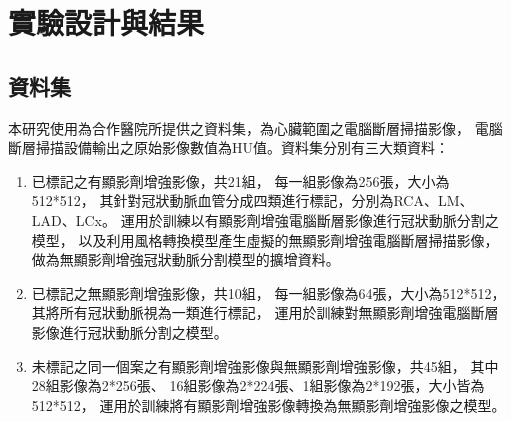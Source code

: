 \documentclass[class=NCU_thesis, crop=false]{standalone}
\begin{document}
\chapter{實驗設計與結果}

\section{資料集}
本研究使用為合作醫院所提供之資料集，為心臟範圍之電腦斷層掃描影像，
電腦斷層掃描設備輸出之原始影像數值為HU值。資料集分別有三大類資料：
\begin{enumerate}
\item 已標記之有顯影劑增強影像，共21組，
每一組影像為256張，大小為512*512，
其針對冠狀動脈血管分成四類進行標記，分別為RCA、LM、LAD、LCx。
運用於訓練以有顯影劑增強電腦斷層影像進行冠狀動脈分割之模型，
以及利用風格轉換模型產生虛擬的無顯影劑增強電腦斷層掃描影像，
做為無顯影劑增強冠狀動脈分割模型的擴增資料。
\item 已標記之無顯影劑增強影像，共10組，
每一組影像為64張，大小為512*512，
其將所有冠狀動脈視為一類進行標記，
運用於訓練對無顯影劑增強電腦斷層影像進行冠狀動脈分割之模型。
\item 未標記之同一個案之有顯影劑增強影像與無顯影劑增強影像，共45組，
其中28組影像為2*256張、 16組影像為2*224張、1組影像為2*192張，大小皆為512*512，
運用於訓練將有顯影劑增強影像轉換為無顯影劑增強影像之模型。
\end{enumerate}

\end{document}
